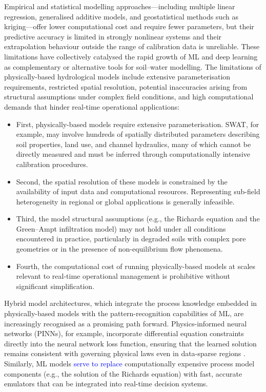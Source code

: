 \documentclass[land,article,submit,pdftex,moreauthors]{Definitions/mdpi}
\numberwithin{equation}{section}
\begin{document}
Empirical and statistical modelling approaches---including multiple linear regression, generalised additive models, and geostatistical methods such as kriging---offer lower computational cost and require fewer parameters, but their predictive accuracy is limited in strongly nonlinear systems and their extrapolation behaviour outside the range of calibration data is unreliable. These limitations have collectively catalysed the rapid growth of ML and deep learning as complementary or alternative tools for soil--water modelling. The limitations of physically-based hydrological models include extensive parameterisation requirements, restricted spatial resolution, potential inaccuracies arising from structural assumptions under complex field conditions, and high computational demands that hinder real-time operational applications:

\begin{itemize}
    \item First, physically-based models require extensive parameterisation. SWAT, for example, may involve hundreds of spatially distributed parameters describing soil properties, land use, and channel hydraulics, many of which cannot be directly measured and must be inferred through computationally intensive calibration procedures.
    \item Second, the spatial resolution of these models is constrained by the availability of input data and computational resources. Representing sub-field heterogeneity in regional or global applications is generally infeasible.    
    \item Third, the model structural assumptions (e.g., the Richards equation and the Green--Ampt infiltration model) may not hold under all conditions encountered in practice, particularly in degraded soils with complex pore geometries or in the presence of non-equilibrium flow phenomena.    
    \item Fourth, the computational cost of running physically-based models at scales relevant to real-time operational management is prohibitive without significant simplification.
\end{itemize}

Hybrid model architectures, which integrate the process knowledge embedded in physically-based models with the pattern-recognition capabilities of ML, are increasingly recognised as a promising path forward. Physics-informed neural networks (PINNs), for example, incorporate differential equation constraints directly into the neural network loss function, ensuring that the learned solution remains consistent with governing physical laws even in data-sparse regions \citep{raissi2019physics}. Similarly, ML models \textcolor{blue}{serve to replace} computationally expensive process model components (e.g., the solution of the Richards equation) with fast, accurate emulators that can be integrated into real-time decision systems.
\end{document}
